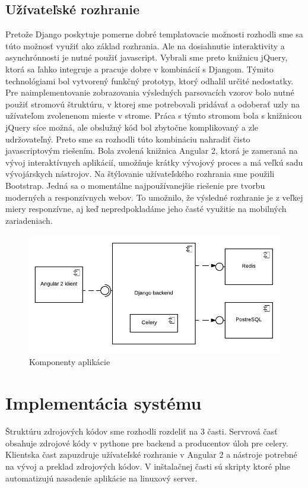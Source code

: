 \subsection{Užívateľské rozhranie}
Pretože Django poskytuje pomerne dobré templatovacie možnosti rozhodli sme sa túto možnosť využiť ako základ rozhrania. Ale na dosiahnutie interaktivity a asynchrónnosti je nutné použiť javascript. Vybrali sme preto knižnicu jQuery, ktorá sa ľahko integruje a pracuje dobre v kombinácií s Djangom. Týmito technológiami bol vytvorený funkčný prototyp, ktorý odhalil určité nedostatky. Pre naimplementovanie zobrazovania výsledných parsovacích vzorov bolo nutné použiť stromovú štruktúru, v ktorej sme potrebovali pridávať a odoberať uzly na užívateľom zvolenenom mieste v strome. Práca s týmto stromom bola s knižnicou jQuery síce možná, ale obslužný kód bol zbytočne komplikovaný a zle udržovateľný. Preto sme sa rozhodli túto kombináciu nahradiť čisto javascriptovým riešením. Bola zvolená knižnica Angular 2, ktorá je zameraná na vývoj interaktívnych aplikácií, umožňuje krátky vývojový proces a má veľkú sadu vývojárskych nástrojov.
Na štýlovanie užívateľského rozhrania sme použili Bootstrap. Jedná sa o momentálne najpoužívanejšie riešenie pre tvorbu moderných a responzívnych webov. To umožnilo, že výsledné rozhranie je z veľkej miery responzívne, aj keď nepredpokladáme jeho časté využitie na mobilných zariadeniach.

\begin{figure}[htbp]
 \centering 
 \begin{minipage}{0.95\linewidth}
 	\centering
 	\includegraphics[width=\textwidth]{Images/thesis-component-diagram.pdf}	
 \end{minipage}
  \caption{Komponenty aplikácie }
  \label{fig:components}
\end{figure}

\section{Implementácia systému}
Štruktúru zdrojových kódov sme rozhodli rozdeliť na 3 časti. Servrová časť obsahuje zdrojové kódy v pythone pre backend a producentov úloh pre celery. Klientska čast zapuzdruje užívateľské rozhranie v Angular 2 a nástroje potrebné na vývoj a preklad zdrojových kódov. V inštalačnej časti sú skripty ktoré plne automatizujú nasadenie aplikácie na linuxový server.